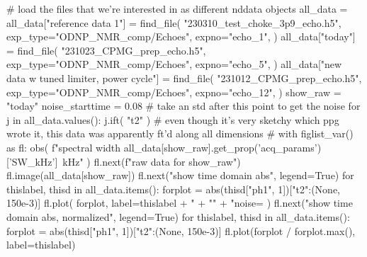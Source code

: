 \begin{err}
\begin{python}[on]
# {{{ load the files that we're interested in as different nddata objects
all_data = {}
all_data["reference data 1"] = find_file(
    "230310_test_choke_3p9_echo.h5",
    exp_type="ODNP_NMR_comp/Echoes",
    expno="echo_1",
)
all_data["today"] = find_file(
    "231023_CPMG_prep_echo.h5",
    exp_type="ODNP_NMR_comp/Echoes",
    expno="echo_5",
)
all_data["new data w tuned limiter, power cycle"] = find_file(
    "231012_CPMG_prep_echo.h5",
    exp_type="ODNP_NMR_comp/Echoes",
    expno="echo_12",
)
show_raw = "today"
noise_starttime = 0.08 # take an std after this point to get the noise
for j in all_data.values():
    j.ift(
        "t2"
    )  # even though it's very sketchy which ppg wrote it, this data was apparently ft'd along all dimensions
# }}}
with figlist_var() as fl:
    obs(
        f"spectral width {all_data[show_raw].get_prop('acq_params')['SW_kHz']}~kHz"
    )
    fl.next(f"raw data for {show_raw}")
    fl.image(all_data[show_raw])
    fl.next("show time domain abs", legend=True)
    for thislabel, thisd in all_data.items():
        forplot = abs(thisd["ph1", 1])["t2":(None, 150e-3)]
        fl.plot(
            forplot,
            label=thislabel
            + "\n%
            + "\n"
            + "noise= %
        )
    fl.next("show time domain abs, normalized", legend=True)
    for thislabel, thisd in all_data.items():
        forplot = abs(thisd["ph1", 1])["t2":(None, 150e-3)]
        fl.plot(forplot / forplot.max(), label=thislabel)
    \end{python}
    \par
\end{err}
\par
